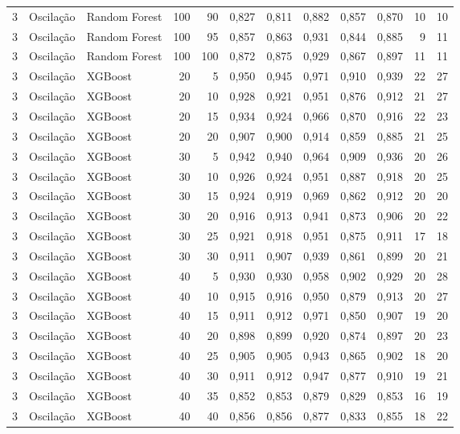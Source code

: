 \begin{longtable}{@{}rllrrrrrrrrr@{}}
3 & Oscilação & Random Forest & 100 & 90 & 0,827 & 0,811 & 0,882 & 0,857 & 0,870 & 10 & 10 \\
3 & Oscilação & Random Forest & 100 & 95 & 0,857 & 0,863 & 0,931 & 0,844 & 0,885 & 9 & 11 \\
3 & Oscilação & Random Forest & 100 & 100 & 0,872 & 0,875 & 0,929 & 0,867 & 0,897 & 11 & 11 \\
3 & Oscilação & XGBoost & 20 & 5 & 0,950 & 0,945 & 0,971 & 0,910 & 0,939 & 22 & 27 \\
3 & Oscilação & XGBoost & 20 & 10 & 0,928 & 0,921 & 0,951 & 0,876 & 0,912 & 21 & 27 \\
3 & Oscilação & XGBoost & 20 & 15 & 0,934 & 0,924 & 0,966 & 0,870 & 0,916 & 22 & 23 \\
3 & Oscilação & XGBoost & 20 & 20 & 0,907 & 0,900 & 0,914 & 0,859 & 0,885 & 21 & 25 \\
3 & Oscilação & XGBoost & 30 & 5 & 0,942 & 0,940 & 0,964 & 0,909 & 0,936 & 20 & 26 \\
3 & Oscilação & XGBoost & 30 & 10 & 0,926 & 0,924 & 0,951 & 0,887 & 0,918 & 20 & 25 \\
3 & Oscilação & XGBoost & 30 & 15 & 0,924 & 0,919 & 0,969 & 0,862 & 0,912 & 20 & 20 \\
3 & Oscilação & XGBoost & 30 & 20 & 0,916 & 0,913 & 0,941 & 0,873 & 0,906 & 20 & 22 \\
3 & Oscilação & XGBoost & 30 & 25 & 0,921 & 0,918 & 0,951 & 0,875 & 0,911 & 17 & 18 \\
3 & Oscilação & XGBoost & 30 & 30 & 0,911 & 0,907 & 0,939 & 0,861 & 0,899 & 20 & 21 \\
3 & Oscilação & XGBoost & 40 & 5 & 0,930 & 0,930 & 0,958 & 0,902 & 0,929 & 20 & 28 \\
3 & Oscilação & XGBoost & 40 & 10 & 0,915 & 0,916 & 0,950 & 0,879 & 0,913 & 20 & 27 \\
3 & Oscilação & XGBoost & 40 & 15 & 0,911 & 0,912 & 0,971 & 0,850 & 0,907 & 19 & 20 \\
3 & Oscilação & XGBoost & 40 & 20 & 0,898 & 0,899 & 0,920 & 0,874 & 0,897 & 20 & 23 \\
3 & Oscilação & XGBoost & 40 & 25 & 0,905 & 0,905 & 0,943 & 0,865 & 0,902 & 18 & 20 \\
3 & Oscilação & XGBoost & 40 & 30 & 0,911 & 0,912 & 0,947 & 0,877 & 0,910 & 19 & 21 \\
3 & Oscilação & XGBoost & 40 & 35 & 0,852 & 0,853 & 0,879 & 0,829 & 0,853 & 16 & 19 \\
3 & Oscilação & XGBoost & 40 & 40 & 0,856 & 0,856 & 0,877 & 0,833 & 0,855 & 18 & 22 \\

\end{longtable}
